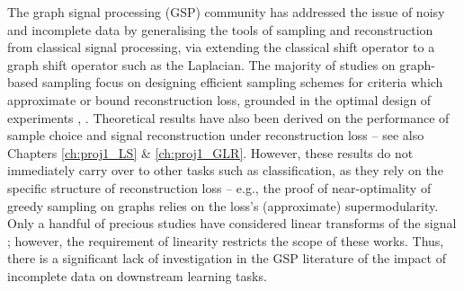 The graph signal processing (GSP) community has addressed the issue of noisy and incomplete data by generalising the tools of sampling and reconstruction from classical signal processing, via extending the classical shift operator to a graph shift operator \cite{ortega2018graph} such as the Laplacian. The majority of studies on graph-based sampling focus on designing efficient sampling schemes for criteria which approximate \cite{wang2018optimal, wang2019low, mfn, tremblay2017graph, jayawant2021doptimal,puy2018random, pakiyarajah2025graph} or bound \cite{bai2020fast,eoptimalchen} reconstruction loss, grounded in the optimal design of experiments \cite{pukelsheim2006optimal}, .  Theoretical results have also been derived on the performance of sample choice and signal reconstruction under reconstruction loss \cite{pesenson2008sampling, puy2018random, chamon2016near, chamon2017greedy, shomorony2014sampling, chen2016signal} -- {see also Chapters} \ref{ch:proj1_LS} \& \ref{ch:proj1_GLR}. %
However, these results do not immediately carry over to other tasks such as classification, as they rely on the specific structure of reconstruction loss -- e.g., the proof of near-optimality of greedy sampling on graphs \cite{chamon2016near} relies on the loss's (approximate) supermodularity. Only a handful of precious studies have considered linear transforms of the signal \cite{chamon2017greedy, gama2020rethinking}; however, the requirement of linearity restricts the scope of these works. Thus, there is a significant lack of investigation in the GSP literature of the impact of incomplete data on downstream learning tasks. %

